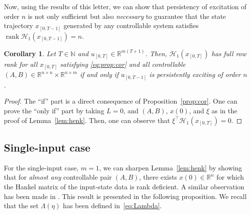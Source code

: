\documentclass[journal,twoside,web]{ieeecolor}
\newtheorem{corollary}[theorem]{Corollary}
\DeclareMathOperator{\rank}{rank}
\begin{document}
Now, using the results of this letter, we can show that persistency of excitation of order $n$ is not only sufficient but also \emph{necessary} to guarantee that the state trajectory $x_{[0,T-1]}$ generated by any controllable system satisfies \mbox{$\rank\mathcal{H}_1(x_{[0,T-1]})=n$}. 

\begin{corollary}
Let $T\in\mathbb{N}$ and $u_{[0,T]}\in\mathbb{R}^{m(T+1)}$. Then, $\mathcal{H}_1(x_{[0,T]})$ has full row rank for all $x_{[0,T]}$ satisfying \eqref{eq:prop:cor} and all controllable $(A,B)\in\mathbb{R}^{n\times n}\times \mathbb{R}^{n\times m}$ if and only if $u_{[0,T-1]}$ is persistently exciting of order $n$. 
\end{corollary}
\begin{proof}
The ``if'' part is a direct consequence of Proposition~\ref{prop:cor}. One can prove the ``only if'' part by taking $L=0$, and $(A,B)$, $x(0)$, and $\xi$ as in the proof of Lemma~\ref{lem:henk}. Then, one can observe that $\xi^\top \mathcal{H}_1(x_{[0,T]})=0$.
\end{proof}

\subsection{Single-input case}

For the single-input case, $m=1$, we can sharpen Lemma~\ref{lem:henk} by showing that for \emph{almost any} controllable pair $(A,B)$, there exists $x(0)\in\mathbb{R}^n$ for which the Hankel matrix of the input-state data is rank deficient. A similar observation has been made in \cite[Thm. 3]{markovsky2023persistency}. This result is presented in the following proposition. We recall that the set $\Lambda(\eta)$ has been defined in~\eqref{eq:Lambda}.
\end{document}
